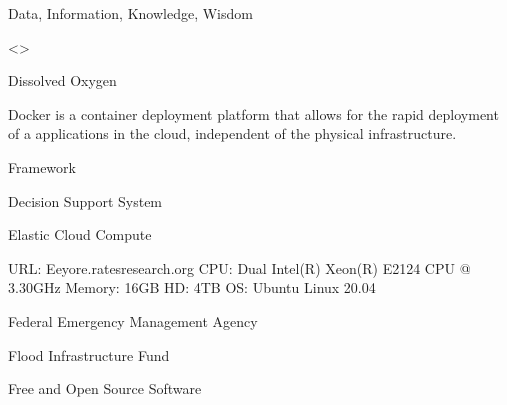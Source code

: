 \documentclass[letterpaper,12pt,english,openany,oneside]{sphinxmanual}
\begin{document}
\begin{description}
\sphinxAtStartPar
Data, Information, Knowledge, Wisdom

\sphinxAtStartPar
\textless{}\textgreater{}

\sphinxAtStartPar
Dissolved Oxygen

\sphinxAtStartPar
Docker is a container deployment platform that allows for the rapid deployment of a applications in the cloud, independent of the physical infrastructure.

\sphinxAtStartPar
{\hyperref[\detokenize{glossary:term-Django}]{}} {\hyperref[\detokenize{glossary:term-ReST}]{}} Framework

\sphinxAtStartPar
Decision Support System

\sphinxAtStartPar
{\hyperref[\detokenize{glossary:term-AWS}]{}} Elastic Cloud Compute

\sphinxAtStartPar
URL: Eeyore.ratesresearch.org CPU: Dual Intel(R) Xeon(R) E\sphinxhyphen{}2124 CPU @ 3.30GHz Memory: 16GB HD: 4TB OS: Ubuntu Linux 20.04

\sphinxAtStartPar
Federal Emergency Management Agency

\sphinxAtStartPar
Flood Infrastructure Fund

\sphinxAtStartPar
Free and Open Source Software


\end{description}
\end{document}
